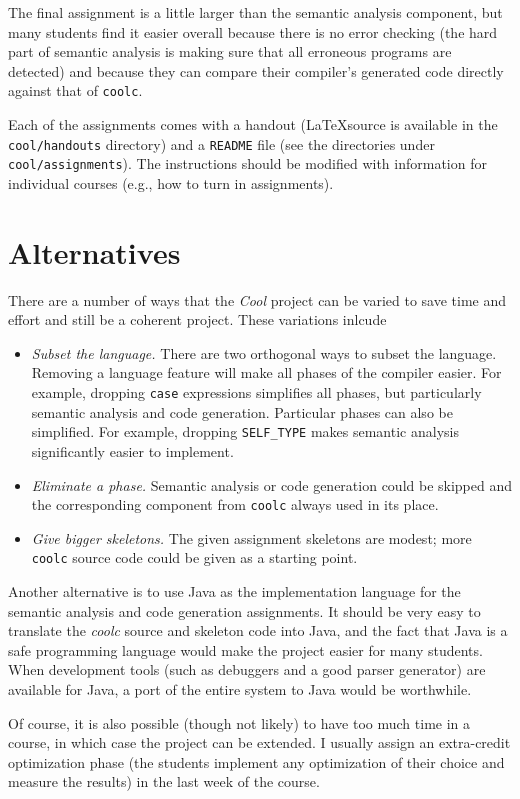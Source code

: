 \documentclass[11pt]{article}
\begin{document}
The final assignment is a little larger than the semantic analysis component,
but many students find it easier overall because there is no error checking
(the hard part of semantic analysis is making sure that all erroneous
programs are detected) and because they can compare their compiler's
generated code directly against that of {\tt coolc}. 

Each of the assignments comes with a handout (\LaTeX source is available
in the {\tt cool/handouts} directory) and a {\tt README} file (see
the directories under {\tt cool/assignments}).  The instructions should
be modified with information for individual courses (e.g., how to turn
in assignments).

\section{Alternatives}

There are a number of ways that the {\em Cool} project can be varied
to save time and effort and still be a coherent project.  These
variations inlcude

\begin{itemize}

\item {\em Subset the language.} There are two orthogonal ways to subset
the language.  Removing a language feature will make all phases of the 
compiler easier.  For example, dropping {\tt case} expressions
simplifies all phases, but particularly semantic analysis and code generation.
Particular phases can also be simplified.  For example, dropping
{\tt SELF\_TYPE} makes semantic analysis significantly easier to implement.

\item {\em Eliminate a phase.} Semantic analysis or code generation could
be skipped and the corresponding component from {\tt coolc} always used in
its place.

\item {\em Give bigger skeletons.}  The given assignment skeletons are modest;
more {\tt coolc} source code could be given as a starting point.

\end{itemize}

Another alternative is to use Java as the implementation language for
the semantic analysis and code generation assignments.  It should be
very easy to translate the {\em coolc} source and skeleton code into
Java, and the fact that Java is a safe programming language would make
the project easier for many students.  When development tools (such as
debuggers and a good parser generator) are available for Java, a port
of the entire system to Java would be worthwhile.

Of course, it is also possible (though not likely) to have too much
time in a course, in which case the project can be extended.  I usually
assign an extra-credit optimization phase (the students implement any
optimization of their choice and measure the results) in the last week
of the course.
\end{document}

